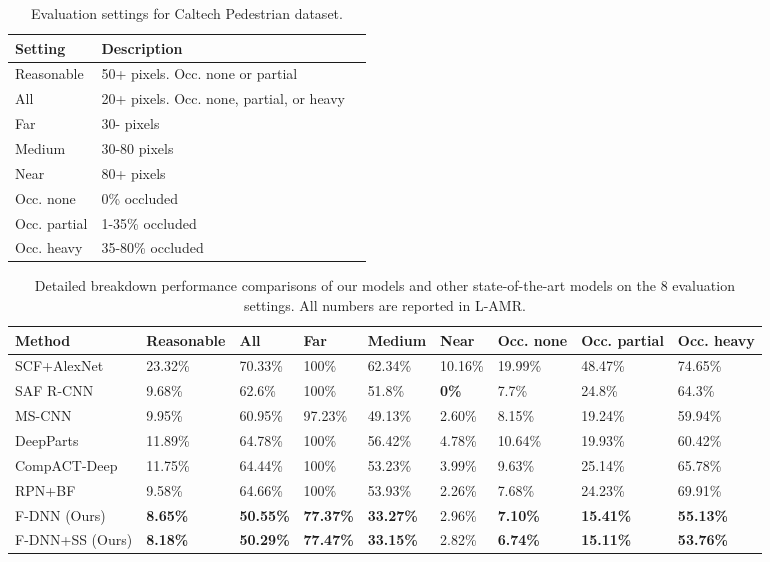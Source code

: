 \documentclass[10pt,letterpaper]{article}
\begin{document}
\begin{table}[h!]
\begin{center}
\begin{tabular}{|l|l|l|}
\hline
Setting & Description\\
\hline\hline
Reasonable & 50+ pixels. Occ. none or partial\\
All & 20+ pixels. Occ. none, partial, or heavy\\
Far & 30- pixels\\
Medium & 30-80 pixels\\
Near & 80+ pixels\\
Occ. none & 0\% occluded\\
Occ. partial & 1-35\% occluded\\
Occ. heavy & 35-80\% occluded\\
\hline
\end{tabular}
\end{center}
\caption{Evaluation settings for Caltech Pedestrian dataset.}
\end{table}

\begin{table*}[h!]
\begin{center}
\begin{tabular}{|l|l|l|l|l|l|l|l|l|}
\hline
Method & Reasonable & All & Far & Medium & Near & Occ. none & Occ. partial & Occ. heavy\\
\hline\hline
SCF+AlexNet \cite{SCF+AlexNet} & 23.32\% & 70.33\% & 100\% & 62.34\% &  10.16\% & 19.99\% & 48.47\% & 74.65\%\\
SAF R-CNN \cite{safcnn} & 9.68\% & 62.6\% & 100\% & 51.8\% & \textbf{0\%} & 7.7\% & 24.8\% & 64.3\%\\
MS-CNN \cite{mscnn} & 9.95\% & 60.95\% & 97.23\% &  49.13\% & 2.60\% & 8.15\% & 19.24\% & 59.94\%\\
DeepParts \cite{DeepParts2015} & 11.89\% & 64.78\% & 100\% & 56.42\% & 4.78\% & 10.64\% & 19.93\% & 60.42\%\\
CompACT-Deep \cite{CompACT2015} & 11.75\% & 64.44\% & 100\% & 53.23\% & 3.99\% & 9.63\% & 25.14\% & 65.78\%\\
RPN+BF \cite{rpn} & 9.58\% & 64.66\% & 100\% & 53.93\% & 2.26\% & 7.68\% & 24.23\% & 69.91\%\\
F-DNN (Ours) & \textbf{8.65\%} & \textbf{50.55\%} & \textbf{77.37\%} & \textbf{33.27\%} & 2.96\% & \textbf{7.10\%} & \textbf{15.41\%} & \textbf{55.13\%}\\
F-DNN+SS (Ours) & \textbf{8.18\%} & \textbf{50.29\%} & \textbf{77.47\%} & \textbf{33.15\%} & 2.82\% & \textbf{6.74\%} & \textbf{15.11\%} & \textbf{53.76\%} \\
\hline
\end{tabular}
\end{center}
\caption{Detailed breakdown performance comparisons of our models and other state-of-the-art models on the 8 evaluation settings. All numbers are reported in L-AMR.}
\end{table*}
\end{document}
